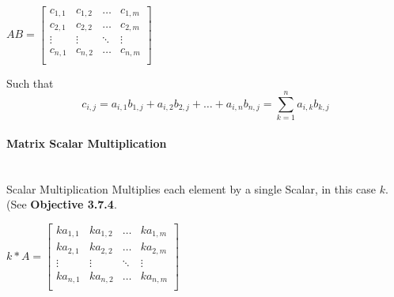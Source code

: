 \begin{flushleft}
                    \begin{center}
                        $
                        AB = 
                        \begin{bmatrix}
                            c_{1,1} & c_{1,2} & \hdots  & c_{1,m} \\
                            c_{2,1} & c_{2,2} & \hdots  & c_{2,m} \\
                            \vdots  & \vdots  & \ddots  & \vdots  \\
                            c_{n,1} & c_{n,2} & \hdots  & c_{n,m} \\
                        \end{bmatrix}
                        $
                    \end{center}
                    \vspace{0.2cm}
                    \begin{center}
                        Such that \[ c_{i,j} = a_{i,1}b_{1,j} + a_{i,2}b_{2,j} + \hdots + a_{i,n}b_{n,j} = \sum^{n}_{k=1}a_{i,k}b_{k,j} \]
                    \end{center}

                \paragraph{Matrix Scalar Multiplication} \mbox{} \\
                    \vspace{0.2cm}
                    Scalar Multiplication Multiplies each element by a single Scalar, in this case $k$. (See \textbf{Objective 3.7.4}.\\

                    \begin{center}
                        $
                        k * A = 
                        \begin{bmatrix}
                            ka_{1,1} & ka_{1,2} & \hdots  & ka_{1,m} \\
                            ka_{2,1} & ka_{2,2} & \hdots  & ka_{2,m} \\
                            \vdots  & \vdots  & \ddots  & \vdots  \\
                            ka_{n,1} & ka_{n,2} & \hdots  & ka_{n,m} \\
                        \end{bmatrix}
                        $
                    \end{center}


\end{flushleft}
